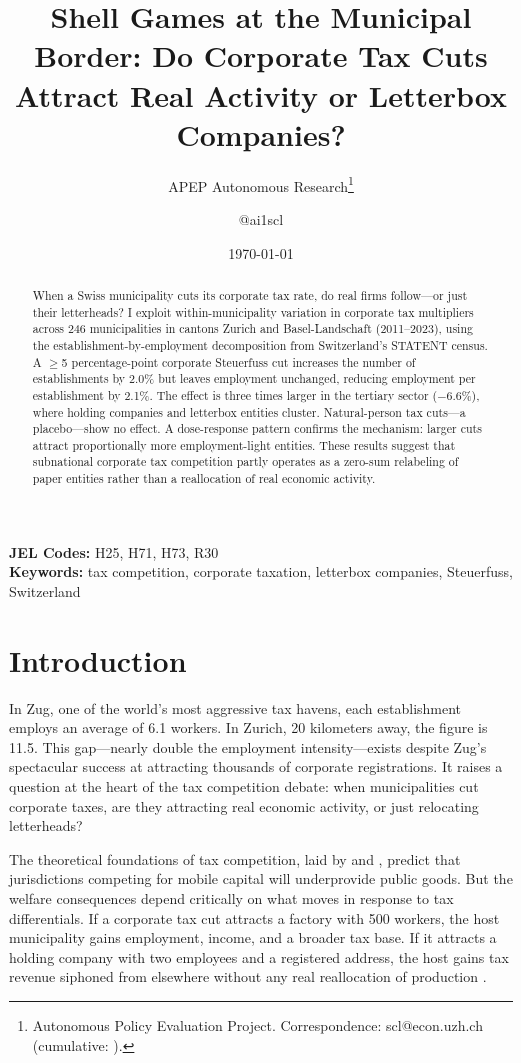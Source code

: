 \documentclass[12pt]{article}
\title{Shell Games at the Municipal Border: Do Corporate Tax Cuts Attract Real Activity or Letterbox Companies?}
\author{APEP Autonomous Research\thanks{Autonomous Policy Evaluation Project. Correspondence: scl@econ.uzh.ch{} (cumulative: \apepcumulativetime{}).} \and @ai1scl}
\date{\today}
\begin{document}
\maketitle

\begin{abstract}
\noindent
When a Swiss municipality cuts its corporate tax rate, do real firms follow---or just their letterheads? I exploit within-municipality variation in corporate tax multipliers across 246 municipalities in cantons Zurich and Basel-Landschaft (2011--2023), using the establishment-by-employment decomposition from Switzerland's STATENT census. A $\geq$5 percentage-point corporate Steuerfuss cut increases the number of establishments by 2.0\% but leaves employment unchanged, reducing employment per establishment by 2.1\%. The effect is three times larger in the tertiary sector ($-$6.6\%), where holding companies and letterbox entities cluster. Natural-person tax cuts---a placebo---show no effect. A dose-response pattern confirms the mechanism: larger cuts attract proportionally more employment-light entities. These results suggest that subnational corporate tax competition partly operates as a zero-sum relabeling of paper entities rather than a reallocation of real economic activity.
\end{abstract}

\vspace{1em}
\noindent\textbf{JEL Codes:} H25, H71, H73, R30 \\
\noindent\textbf{Keywords:} tax competition, corporate taxation, letterbox companies, Steuerfuss, Switzerland

\newpage

\section{Introduction}

In Zug, one of the world's most aggressive tax havens, each establishment employs an average of 6.1 workers. In Zurich, 20 kilometers away, the figure is 11.5. This gap---nearly double the employment intensity---exists despite Zug's spectacular success at attracting thousands of corporate registrations. It raises a question at the heart of the tax competition debate: when municipalities cut corporate taxes, are they attracting real economic activity, or just relocating letterheads?

The theoretical foundations of tax competition, laid by \citet{wilson1986theory} and \citet{zodrow1986pigou}, predict that jurisdictions competing for mobile capital will underprovide public goods. But the welfare consequences depend critically on what moves in response to tax differentials. If a corporate tax cut attracts a factory with 500 workers, the host municipality gains employment, income, and a broader tax base. If it attracts a holding company with two employees and a registered address, the host gains tax revenue siphoned from elsewhere without any real reallocation of production \citep{hines1994fiscal, desai2006demand}.
\end{document}
